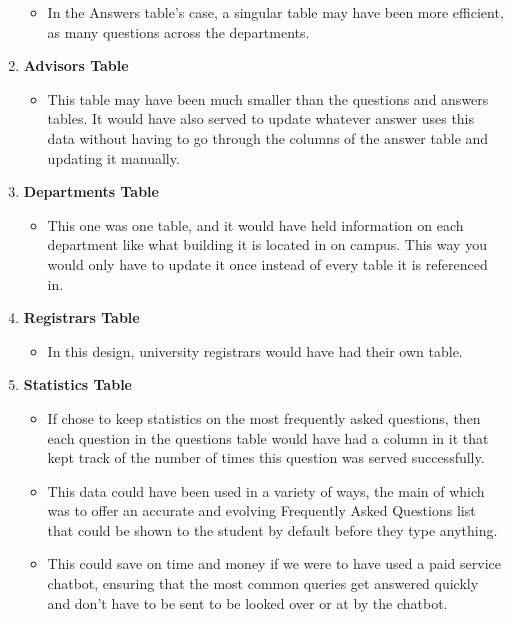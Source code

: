 \documentclass[titlepage, 12pt]{article}
\begin{document}
\begin{enumerate}
\begin{itemize}
        \item In the Answers table’s case, a singular table may have been more efficient, as many questions across the departments.
    \end{itemize}
    \item \textbf{Advisors Table}
    \begin{itemize}
        \item This table may have been much smaller than the questions and answers tables. It would have also served to update whatever answer uses this data without having to go through the columns of the answer table and updating it manually.
    \end{itemize}
    \item \textbf{Departments Table}
    \begin{itemize}
        \item This one was one table, and it would have held information on each department like what building it is located in on campus. This way you would only have to update it once instead of every table it is referenced in.
    \end{itemize}
    \item \textbf{Registrars Table}
    \begin{itemize}
        \item In this design, university registrars would have had their own table.
    \end{itemize}
    \item \textbf{Statistics Table}
    \begin{itemize}
        \item If chose to keep statistics on the most frequently asked questions, then each question in the questions table would have had a column in it that kept track of the number of times this question was served successfully.
        \item This data could have been used in a variety of ways, the main of which was to offer an accurate and evolving Frequently Asked Questions list that could be shown to the student by default before they type anything.
        \item This could save on time and money if we were to have used a paid service chatbot, ensuring that the most common queries get answered quickly and don’t have to be sent to be looked over or at by the chatbot.
    \end{itemize}
\end{enumerate}
\end{document}
